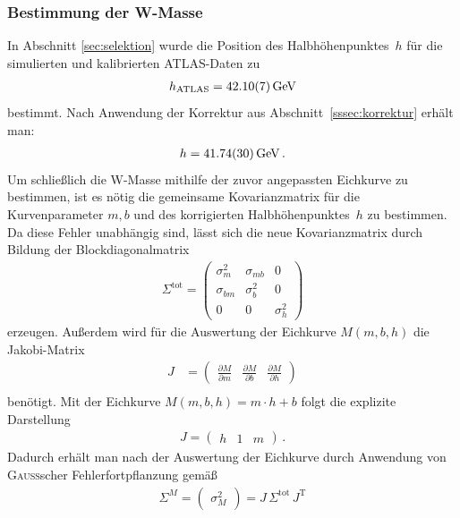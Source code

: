 \documentclass[11pt, a4paper]{article}
\numberwithin{equation}{section}
\begin{document}
\subsubsection{Bestimmung der W-Masse}
In Abschnitt \ref{sec:selektion} wurde die Position des Halbhöhenpunktes~$h$ für die simulierten und kalibrierten ATLAS-Daten zu
\begin{align*}
	h_\mathrm{ATLAS} = \SI{42.10 +- 0.07}{\GeV}
\end{align*}
bestimmt.
Nach Anwendung der Korrektur aus Abschnitt~\ref{sssec:korrektur} erhält man:
\begin{align*}
	h = \SI{41.74 +- 0.30}{\GeV} \, \text{.}
\end{align*}
Um schließlich die W-Masse mithilfe der zuvor angepassten Eichkurve zu bestimmen, ist es nötig die gemeinsame Kovarianzmatrix für die Kurvenparameter $m, b$ und des korrigierten Halbhöhenpunktes~$h$ zu bestimmen.
Da diese Fehler unabhängig sind, lässt sich die neue Kovarianzmatrix durch Bildung der Blockdiagonalmatrix
\begin{align*}
	\Sigma^\mathrm{tot} = \begin{pmatrix}
		\sigma_m^2  & \sigma_{mb} & 0 \\
		\sigma_{bm} & \sigma_b^2  & 0 \\
		0           & 0           & \sigma_h^2
	\end{pmatrix}
\end{align*}
erzeugen.
Außerdem wird für die Auswertung der Eichkurve $M(m, b, h)$ die Jakobi-Matrix
\begin{align*}
	J &= \begin{pmatrix}
	\frac{\partial M}{\partial m} &
	\frac{\partial M}{\partial b} &
	\frac{\partial M}{\partial h}
	\end{pmatrix} \\
\end{align*}
benötigt.
Mit der Eichkurve $M(m, b, h) = m \cdot h + b$ folgt die explizite Darstellung
\begin{align*}
	J=\begin{pmatrix}
	h & 1 & m
	\end{pmatrix} \, \text{.}
\end{align*}
Dadurch erhält man nach der Auswertung der Eichkurve durch Anwendung von \textsc{Gauß}scher Fehlerfortpflanzung gemäß \cite{error_prop}
\begin{align*}
	\Sigma^M = \begin{pmatrix}
	\sigma_{M}^2
	\end{pmatrix} = J \, \Sigma^\mathrm{tot} \, J^\mathrm{T}
\end{align*}
\end{document}
